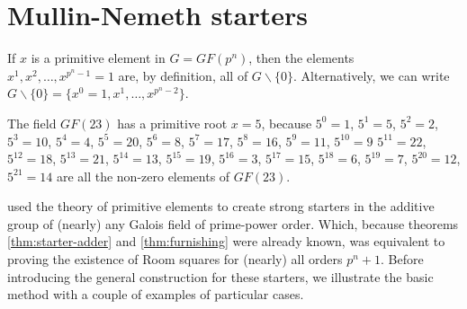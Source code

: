 \documentclass[
  11pt,
  a4paper]{book}
\newcounter{example}
\begin{document}
\hypertarget{mullin-nemeth-starters}{%
\section{Mullin-Nemeth starters}\label{mullin-nemeth-starters}}

If \(x\) is a primitive element in \(G = GF(p^n)\), then the elements
\(x^1, x^2, \ldots, x^{p^n - 1} = 1\) are, by definition, all of
\(G \backslash \{0\}\). Alternatively, we can write
\(G \backslash \{0\} = \{x^0 = 1, x^1, \ldots, x^{p^n - 2}\}\).

\begin{example}
The field $GF(23)$ has a primitive root $x = 5$, because
$5^0 = 1$, $5^1 = 5$, $5^2 = 2$, $5^3 = 10$, $5^4 = 4$,
$5^5 = 20$, $5^6 = 8$, $5^7 = 17$, $5^8 = 16$, $5^9 = 11$,
$5^{10} = 9$ $5^{11} = 22$, $5^{12} = 18$, $5^{13} = 21$,
$5^{14}  =13$, $5^{15} = 19$, $5^{16} = 3$, $5^{17} = 15$,
$5^{18} = 6$, $5^{19} = 7$, $5^{20} = 12$, $5^{21} = 14$
are all the non-zero elements of $GF(23)$.
\end{example}

\textcite{mullin_furnishing_1969} used the theory of primitive elements
to create strong starters in the additive group of (nearly) any Galois
field of prime-power order. Which, because theorems
\ref{thm:starter-adder} and \ref{thm:furnishing} were already known, was
equivalent to proving the existence of Room squares for (nearly) all
orders \(p^n + 1\). Before introducing the general construction for
these starters, we illustrate the basic method with a couple of examples
of particular cases.
\end{document}
